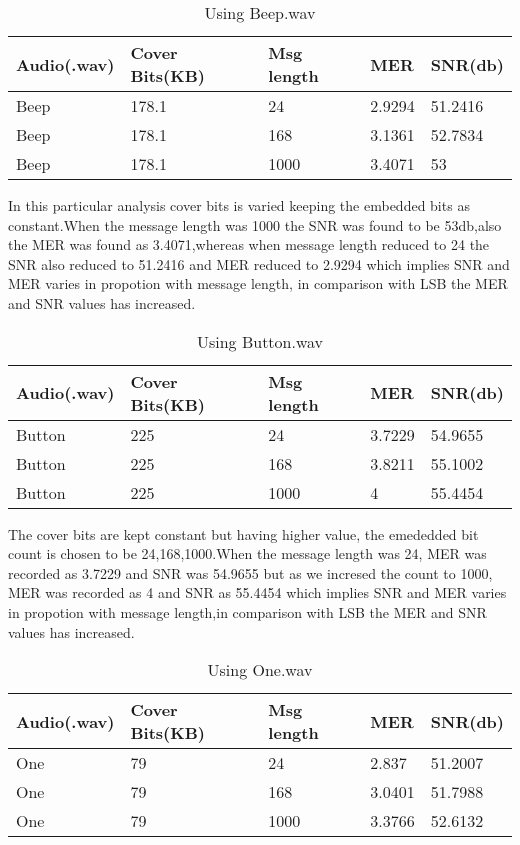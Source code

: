 \documentclass[a4paper, 12pt, notitlepage]{report}
\begin{document}
\begin{table}[h]
\begin{tabular}{|l|l|l|l|l|}
\hline
\textbf{ Audio(.wav)}&\textbf{Cover Bits(KB)}&\textbf{Msg length}&\textbf{MER}&\textbf{SNR(db)} \\ \hline
 Beep&178.1  &24  &2.9294  &51.2416  \\ \hline
 Beep&178.1  &168  &3.1361  &52.7834  \\ \hline
 Beep&178.1  &1000  &3.4071  &53  \\ \hline
\end{tabular}
\caption{Using Beep.wav}
\end{table}

In this particular analysis cover bits is varied keeping the embedded bits as constant.When the message length was 1000 the SNR was found to be 53db,also the MER was found as 3.4071,whereas when message length reduced to 24 the SNR also reduced to 51.2416 and MER reduced to 2.9294 which implies SNR and MER varies in propotion with message length, in comparison with LSB the MER and SNR values has increased.\\

\begin{table}[h]
\begin{tabular}{|l|l|l|l|l|}
\hline
\textbf{ Audio(.wav)}&\textbf{Cover Bits(KB)}&\textbf{Msg length}&\textbf{MER}&\textbf{SNR(db)} \\ \hline
 Button&225  &24  &3.7229  &54.9655  \\ \hline
 Button&225  &168  &3.8211  &55.1002  \\ \hline
 Button&225  &1000  &4  &55.4454  \\ \hline
\end{tabular}
\caption{Using Button.wav}
\end{table}

The cover bits are kept constant but having higher value, the emededded bit count is chosen to be 24,168,1000.When the message length was 24, MER was recorded as 3.7229 and SNR was 54.9655 but as we incresed the count to 1000, MER was recorded as 4 and SNR as 55.4454 which implies SNR and MER varies in propotion with message length,in comparison with LSB the MER and SNR values has increased.\\

\begin{table}[h]
\begin{tabular}{|l|l|l|l|l|}
\hline
\textbf{ Audio(.wav)}&\textbf{Cover Bits(KB)}&\textbf{Msg length}&\textbf{MER}&\textbf{SNR(db)} \\ \hline
 One&79  &24  &2.837  &51.2007  \\ \hline
 One&79  &168  &3.0401  &51.7988  \\ \hline
 One&79  &1000  &3.3766  &52.6132  \\ \hline
\end{tabular}
\caption{Using One.wav}
\end{table}
\end{document}
